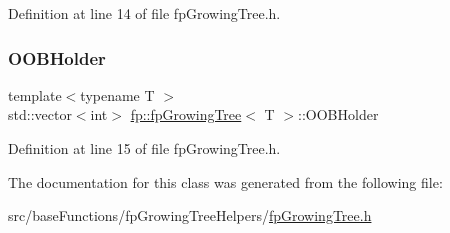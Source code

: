 Definition at line 14 of file fp\+Growing\+Tree.\+h.

\mbox{\label{classfp_1_1fpGrowingTree_afdd5b18a4e4f282e3c5aba30caf918c0}} 
\subsubsection{\texorpdfstring{O\+O\+B\+Holder}{OOBHolder}}
{\footnotesize\ttfamily template$<$typename T $>$ \\
std\+::vector$<$int$>$ \hyperlink{classfp_1_1fpGrowingTree}{fp\+::fp\+Growing\+Tree}$<$ T $>$\+::O\+O\+B\+Holder\hspace{0.3cm}{\ttfamily [protected]}}



Definition at line 15 of file fp\+Growing\+Tree.\+h.



The documentation for this class was generated from the following file\+:\begin{DoxyCompactItemize}
\item 
src/base\+Functions/fp\+Growing\+Tree\+Helpers/\hyperlink{fpGrowingTree_8h}{fp\+Growing\+Tree.\+h}\end{DoxyCompactItemize}
